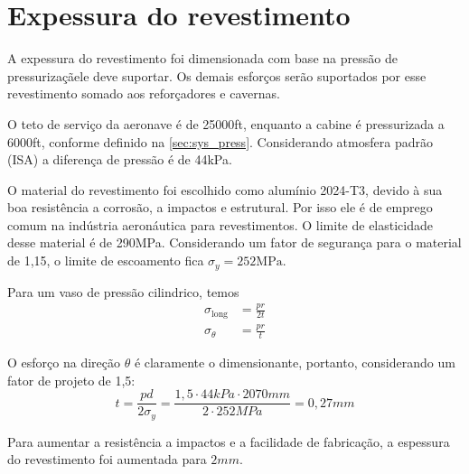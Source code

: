 \section{Expessura do revestimento}

A expessura do revestimento foi dimensionada com base na pressão de pressurizaçãele deve suportar.
Os demais esforços serão suportados por esse revestimento somado aos reforçadores e cavernas.

O teto de serviço da aeronave é de 25000ft, 
enquanto a cabine é pressurizada a 6000ft, 
conforme definido na \autoref{sec:sys_press}. 
Considerando atmosfera padrão (ISA) a diferença de pressão é de 44kPa.

O material do revestimento foi escolhido como alumínio 2024-T3, devido à sua boa resistência a corrosão, a impactos e estrutural.
Por isso ele é de emprego comum na indústria aeronáutica para revestimentos.
O limite de elasticidade desse material é de 290MPa.
Considerando um fator de segurança para o material de 1,15, o limite de escoamento fica $\sigma_y = 252\text{MPa}$.

Para um vaso de pressão cilindrico, temos
\begin{align}
\sigma_\text{long} &= \frac{pr}{2t} \\
\sigma_\theta      &= \frac{pr}{t}
\end{align}

O esforço na direção $\theta$ é claramente o dimensionante, portanto, considerando um fator de projeto de 1,5:
\begin{equation}
    t = \frac{pd}{2\sigma_y} = \frac{1,5 \cdot 44\si{kPa} \cdot 2070\si{mm}}{2 \cdot 252\si{MPa}} = 0,27\si{mm}
\end{equation}

Para aumentar a resistência a impactos e a facilidade de fabricação, a espessura do revestimento foi aumentada para $2\si{mm}$.



